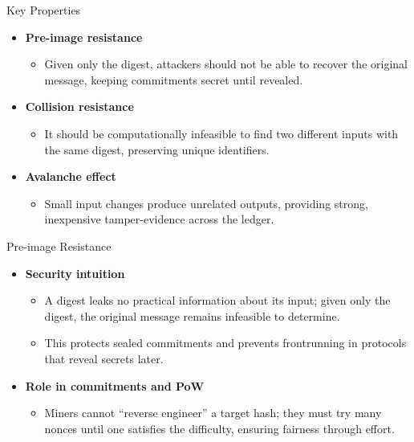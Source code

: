 \documentclass[aspectratio=169]{beamer}
\begin{document}
\begin{frame}{Key Properties}
  \begin{itemize}
    \item \textbf{Pre-image resistance}
      \begin{itemize}
        \item Given only the digest, attackers should not be able to recover the original message, keeping commitments secret until revealed.
      \end{itemize}
    \item \textbf{Collision resistance}
      \begin{itemize}
        \item It should be computationally infeasible to find two different inputs with the same digest, preserving unique identifiers.
      \end{itemize}
    \item \textbf{Avalanche effect}
      \begin{itemize}
        \item Small input changes produce unrelated outputs, providing strong, inexpensive tamper-evidence across the ledger.
      \end{itemize}
  \end{itemize}
\end{frame}

\begin{frame}{Pre-image Resistance}
  \begin{itemize}
    \item \textbf{Security intuition}
      \begin{itemize}
        \item A digest leaks no practical information about its input; given only the digest, the original message remains infeasible to determine.
        \item This protects sealed commitments and prevents frontrunning in protocols that reveal secrets later.
      \end{itemize}
    \item \textbf{Role in commitments and PoW}
      \begin{itemize}
        \item Miners cannot “reverse engineer” a target hash; they must try many nonces until one satisfies the difficulty, ensuring fairness through effort.
      \end{itemize}
  \end{itemize}
\end{frame}
\end{document}
